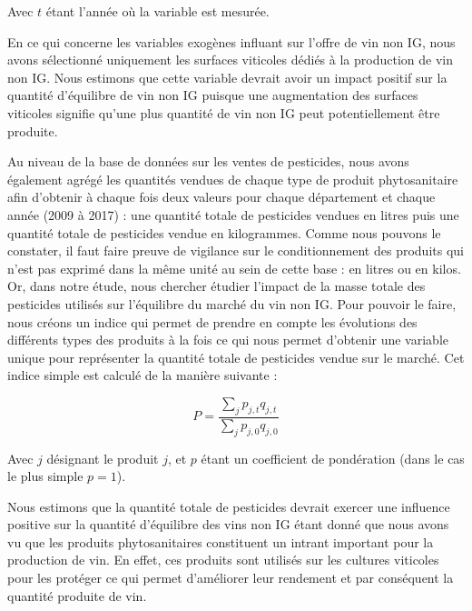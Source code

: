 \documentclass[11pt,]{article}
\begin{document}
Avec \(t\) étant l'année où la variable est mesurée.

En ce qui concerne les variables exogènes influant sur l'offre de vin
non IG, nous avons sélectionné uniquement les surfaces viticoles dédiés
à la production de vin non IG. Nous estimons que cette variable devrait
avoir un impact positif sur la quantité d'équilibre de vin non IG
puisque une augmentation des surfaces viticoles signifie qu'une plus
quantité de vin non IG peut potentiellement être produite.

Au niveau de la base de données sur les ventes de pesticides, nous avons
également agrégé les quantités vendues de chaque type de produit
phytosanitaire afin d'obtenir à chaque fois deux valeurs pour chaque
département et chaque année (2009 à 2017) : une quantité totale de
pesticides vendues en litres puis une quantité totale de pesticides
vendue en kilogrammes. Comme nous pouvons le constater, il faut faire
preuve de vigilance sur le conditionnement des produits qui n'est pas
exprimé dans la même unité au sein de cette base : en litres ou en
kilos. Or, dans notre étude, nous chercher étudier l'impact de la masse
totale des pesticides utilisés sur l'équilibre du marché du vin non IG.
Pour pouvoir le faire, nous créons un indice qui permet de prendre en
compte les évolutions des différents types des produits à la fois ce qui
nous permet d'obtenir une variable unique pour représenter la quantité
totale de pesticides vendue sur le marché. Cet indice simple est calculé
de la manière suivante :

\begin{equation*}
  P = \frac{\sum_j p_{j, t} q_{j, t}}{\sum_j p_{j, 0} q_{j, 0}}
\end{equation*}

Avec \(j\) désignant le produit \(j\), et \(p\) étant un coefficient de
pondération (dans le cas le plus simple \(p = 1\)).

Nous estimons que la quantité totale de pesticides devrait exercer une
influence positive sur la quantité d'équilibre des vins non IG étant
donné que nous avons vu que les produits phytosanitaires constituent un
intrant important pour la production de vin. En effet, ces produits sont
utilisés sur les cultures viticoles pour les protéger ce qui permet
d'améliorer leur rendement et par conséquent la quantité produite de
vin.
\end{document}
